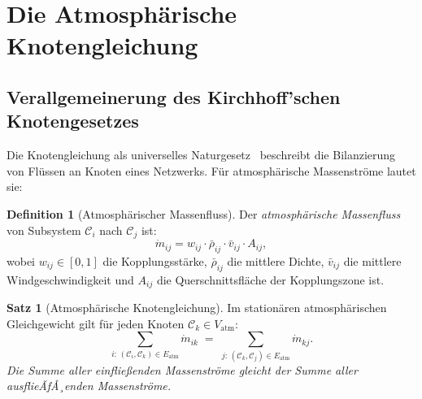 ﻿\documentclass[a4paper,12pt]{article}
\theoremstyle{definition}
\newtheorem{definition}{Definition}
\newtheorem{satz}{Satz}
\begin{document}
\section{Die Atmosph\"arische Knotengleichung}

\subsection{Verallgemeinerung des Kirchhoff'schen Knotengesetzes}

Die Knotengleichung als universelles Naturgesetz~\cite{epp2026knoten} beschreibt
die Bilanzierung von Fl\"ussen an Knoten eines Netzwerks. F\"ur atmosph\"arische
Massenstr\"ome lautet sie:

\begin{definition}[Atmosph\"arischer Massenfluss]
Der \emph{atmosph\"arische Massenfluss} von Subsystem $\mathcal{C}_i$ nach
$\mathcal{C}_j$ ist:
\[
\dot{m}_{ij} = w_{ij} \cdot \bar{\rho}_{ij} \cdot \bar{v}_{ij} \cdot A_{ij},
\]
wobei $w_{ij} \in [0,1]$ die Kopplungsst\"arke, $\bar{\rho}_{ij}$ die mittlere
Dichte, $\bar{v}_{ij}$ die mittlere Windgeschwindigkeit und $A_{ij}$ die
Querschnittsfl\"ache der Kopplungszone ist.
\end{definition}

\begin{satz}[Atmosph\"arische Knotengleichung]
\label{satz:knotengl}
Im station\"aren atmosph\"arischen Gleichgewicht gilt f\"ur jeden Knoten
$\mathcal{C}_k \in V_{\mathrm{atm}}$:
\[
\sum_{i:\, (\mathcal{C}_i, \mathcal{C}_k) \in E_{\mathrm{atm}}} \dot{m}_{ik}
\;=\;
\sum_{j:\, (\mathcal{C}_k, \mathcal{C}_j) \in E_{\mathrm{atm}}} \dot{m}_{kj}.
\]
\emph{Die Summe aller einflie{\ss}enden Massenstr\"ome gleicht der Summe aller
ausflieÃƒÅ¸enden Massenstr\"ome.}
\end{satz}
\end{document}
